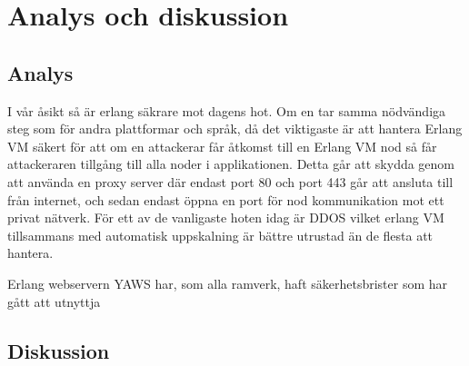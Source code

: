\documentclass[12pt]{article}
\begin{document}
\section{	Analys och diskussion}


\subsection*{Analys}
I vår åsikt så är erlang säkrare mot dagens hot.
 Om en tar samma nödvändiga steg som för andra plattformar och språk, då det viktigaste är att hantera Erlang VM säkert för att om en attackerar får åtkomst till en Erlang VM nod så får attackeraren tillgång till alla noder i applikationen.
 Detta går att skydda genom att använda en proxy \cite{101} server där endast port 80 och port 443 går att ansluta till från internet, och sedan endast öppna en port för nod kommunikation mot ett privat nätverk.
 För ett av de vanligaste hoten idag är DDOS vilket erlang VM tillsammans med automatisk uppskalning är bättre utrustad än de flesta att hantera.

Erlang webservern YAWS har, som alla ramverk, haft säkerhetsbrister som har gått att utnyttja \cite{exploit} 
	\subsection*{Diskussion}
\end{document}
